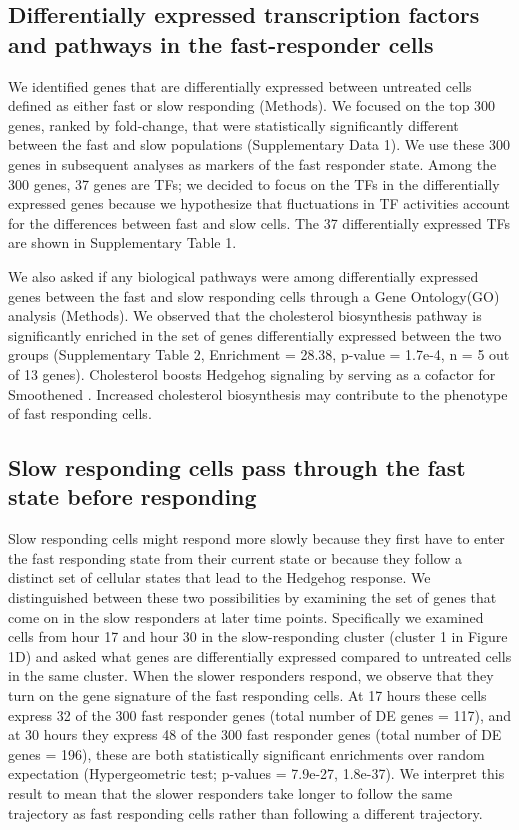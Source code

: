 \subsection{Differentially expressed transcription factors and pathways in the fast-responder cells}

We identified genes that are differentially expressed between untreated cells defined as either fast or slow responding (Methods). We focused on the top 300 genes, ranked by fold-change, that were statistically significantly different between the fast and slow populations (Supplementary Data 1). We use these 300 genes in subsequent analyses as markers of the fast responder state. Among the 300 genes, 37 genes are TFs; we decided to focus on the TFs in the differentially expressed genes because we hypothesize that fluctuations in TF activities account for the differences between fast and slow cells. The 37 differentially expressed TFs are shown in Supplementary Table 1. 

We also asked if any biological pathways were among differentially expressed genes between the fast and slow responding cells through a Gene Ontology(GO) analysis (Methods). We observed that the cholesterol biosynthesis pathway is significantly enriched in the set of genes differentially expressed between the two groups (Supplementary Table 2, Enrichment = 28.38, p-value = 1.7e-4, n = 5 out of 13 genes). Cholesterol boosts Hedgehog signaling by serving as a cofactor for Smoothened \cite{Huang2018-iz,Huang2016-er,Kinnebrew2019-gt,Luchetti2016-cd,Radhakrishnan2020-ii}. Increased cholesterol biosynthesis may contribute to the phenotype of fast responding cells. 


\subsection{Slow responding cells pass through the fast state before responding}

Slow responding cells might respond more slowly because they first have to enter the fast responding state from their current state or because they follow a distinct set of cellular states that lead to the Hedgehog response. We distinguished between these two possibilities by examining the set of genes that come on in the slow responders at later time points. Specifically we examined cells from hour 17 and hour 30 in the slow-responding cluster (cluster 1 in Figure 1D) and asked what genes are differentially expressed compared to untreated cells in the same cluster. When the slower responders respond, we observe that they turn on the gene signature of the fast responding cells. At 17 hours these cells express 32 of the 300 fast responder genes (total number of DE genes = 117), and at 30 hours they express 48 of the 300 fast responder genes (total number of DE genes = 196), these are both statistically significant enrichments over random expectation (Hypergeometric test; p-values = 7.9e-27, 1.8e-37). We interpret this result to mean that the slower responders take longer to follow the same trajectory as fast responding cells rather than following a different trajectory.

